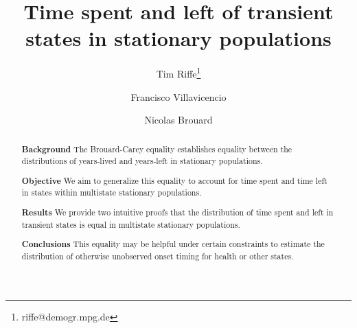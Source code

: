 \documentclass[12pt,oneside,a4paper]{article}
\newcommand{\absdiv}[1]{%
  \par\addvspace{.5\baselineskip}%
  \noindent\textbf{#1}\quad\ignorespaces
}
\theoremstyle{definition}
\begin{document}
\title{Time spent and left of transient states in
stationary populations}

\author[1]{Tim Riffe\thanks{riffe@demogr.mpg.de}}
\author[2]{Francisco Villavicencio}
\author[3]{Nicolas Brouard}





\maketitle

\vspace{-2em}

              
\maketitle

\begin{abstract}
\absdiv{Background} The Brouard-Carey equality establishes equality
between the distributions of years-lived and years-left in stationary populations. 
\absdiv{Objective} We aim to generalize this equality to account for time
spent and time left in states within multistate stationary populations. 
\absdiv{Results} We
provide two intuitive proofs that the distribution of time spent and left in
transient states is equal in multistate stationary populations.
\absdiv{Conclusions} This equality may be helpful under
certain constraints to estimate the distribution of otherwise unobserved onset timing for health or other states.
\end{abstract}
\end{document}

